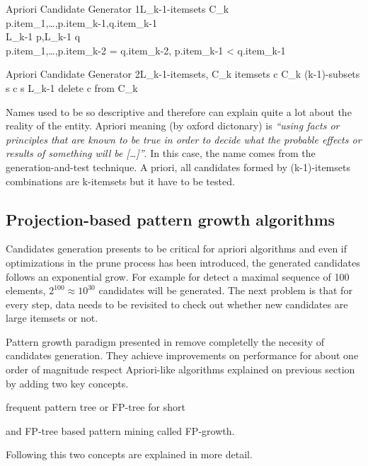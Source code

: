 \begin{pseudocode}{Apriori Candidate Generator 1}{L_{k-1}-itemsets}
\label{pc:apriori_candidate_generator1}
 \quad C_{k}\\
 \quad p.item_{1},\ldots,p.item_{k-1},q.item_{k-1}\\
 \quad L_{k-1} \quad p,L_{k-1} \quad q\\
 \quad p.item_{1},\ldots,p.item_{k-2} = q.item_{k-2}, 
p.item_{k-1} < q.item_{k-1}\\
\end{pseudocode}


\begin{pseudocode}{Apriori Candidate Generator 2}{L_{k-1}-itemsets, C_{k}}
\label{pc:apriori_candidate_generator2}
    \FORALL itemsets \quad c \in C_{k} \DO
    \BEGIN
        \FORALL (k-1)-subsets \quad s \in c \DO
        \BEGIN
            \IF s \not\in  L_{k-1} \THEN
                delete \quad c \quad from \quad C_{k}\\
        \END
    \END
\end{pseudocode}

Names used to be so descriptive and therefore can explain quite a lot about the
reality of the entity. Apriori meaning (by oxford dictonary) is {\it “using facts or
principles that are known to be true in order to decide what the probable
effects or results of something will be [\dots]”}. In this case, the name comes
from the generation-and-test technique. A priori, all candidates formed by
(k-1)-itemsets combinations are k-itemsets but it have to be tested.

\subsection{Projection-based pattern growth algorithms}

Candidates generation presents to be critical for apriori algorithms and even if
optimizations in the prune process has been introduced, the generated candidates
follows an exponential grow. For example for detect a maximal sequence of 100
elements, $2^{100} \approx 10^{30}$ candidates will be generated. The next
problem is that for every step, data needs to be revisited to check out whether 
new candidates are large itemsets or not. 

Pattern growth paradigm presented in \cite{han2000mining1} remove
completelly the necesity of candidates generation. They achieve improvements on
performance for about one order of magnitude respect Apriori-like algorithms
explained on previous section by adding two key concepts. 
\begin{enumerate*}[label=(\roman*)]
  \item frequent pattern tree or FP-tree for short
  \item and FP-tree based pattern mining called FP-growth.
\end{enumerate*}
Following this two concepts are explained in more detail.

